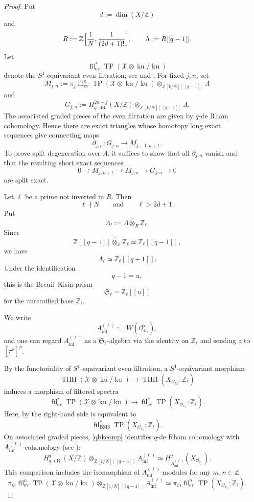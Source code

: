 \documentclass[11pt]{amsart}
\numberwithin{equation}{section}
\newcommand{\Z}{\mathbb{Z}}
\newcommand{\sO}{\mathcal{O}}
\newcommand{\ev}{\operatorname{ev}}
\newcommand{\mf}{\mathfrak}
\newcommand{\qdR}{q\text{-}\operatorname{{dR}}}
\newcommand{\fil}{{\operatorname{fil}}}
\newcommand{\BMS}{\mathrm{BMS}}
\newcommand{\mS}{\mf{S}}
\numberwithin{equation}{section}
\newcommand{\Ainf}{A_{\operatorname{inf}}}
\newcommand{\THH}{\operatorname{THH}}
\newcommand{\TP}{\operatorname{TP}}
\newcommand{\ku}{\operatorname{ku}}
\begin{document}
\begin{proof}
Put
\[
  d:=\dim(X/\Z)
\]
and
\[
  R:=\Z\Bigl[\frac{1}{N},\frac{1}{(2d+1)!}\Bigr],
  \qquad
  \Lambda:=R[[q-1]].
\]
Let
\[
  \fil_{\ev}^{*}
  \TP(\mathcal X\otimes\ku/\ku)
\]
denote the $S^1$-equivariant even filtration; see \cite{HRW22} and \cite{P25}. For fixed $j,n$, set
\[
  M_{j,n}:=
  \pi_j\fil_{\ev}^{n}
  \TP(\mathcal X\otimes\ku/\ku)
  \otimes_{\Z[1/N][[q-1]]}\Lambda
\]
and
\[
  G_{j,n}:=
  H_{\qdR}^{2n-j}(X/\Z)
  \otimes_{\Z[1/N][[q-1]]}\Lambda .
\]
The associated graded pieces of the even filtration are given by
$q$-de Rham cohomology. Hence there are exact triangles whose homotopy
long exact sequences give connecting maps
\[
  \partial_{j,n}:G_{j,n}\longrightarrow M_{j-1,n+1}.
\]
To prove split degeneration over $\Lambda$, it suffices to show that all
$\partial_{j,n}$ vanish and that the resulting short exact sequences
\begin{equation}\label{qshort}
  0
  \to
  M_{j,n+1}
  \to
  M_{j,n}
  \to
  G_{j,n}
  \to
  0
\end{equation}
are split exact.

Let $\ell$ be a prime not inverted in $R$. Then
\[
  \ell\nmid N
  \qquad\text{and}\qquad
  \ell>2d+1.
\]
Put
\[
  \Lambda_\ell
  :=
  \Lambda\widehat\otimes_R\Z_\ell .
\]
Since
\[
  \Z[[q-1]]\widehat\otimes_{\Z}\Z_\ell
  \simeq
  \Z_\ell[[q-1]],
\]
we have
\[
  \Lambda_\ell\simeq \Z_\ell[[q-1]].
\]
Under the identification
\[
  q-1=u,
\]
this is the Breuil--Kisin prism
\[
  \mS_\ell=\Z_\ell[[u]]
\]
for the unramified base $\Z_\ell$.

We write
\[
  \Ainf^{(\ell)}:=W(\sO_{\mathbb{C}_\ell}^{\flat}),
  \]
and one can regard $\Ainf^{(\ell)}$ as a $\mS_\ell$-algebra via the identity on $\Z_\ell$ and sending $z$ to $[\pi^{\flat}]^p$.

By the functoriality of $S^1$-equivariant even filtration, a $S^1$-equivariant morphism 
\[
    \THH(\mathcal X\otimes\ku/\ku) \to \THH(X_{\sO_{\mathbb{C}_\ell}};\Z_\ell)
  \]
  induces a morphism of filtered spectra
\begin{equation}\label{qbkcomp}
  \fil_{\ev}^{*}
  \TP(\mathcal X\otimes\ku/\ku)
  \to
  \fil_{\ev}^{*}
  \TP(X_{\sO_{\mathbb{C}_\ell}};\Z_\ell).
\end{equation}
Here, by \cite[Theorem 5.0.3]{HRW22} the right-hand side is equivalent to 
\[
    \fil_{\BMS}^{*}
  \TP(X_{\sO_{\mathbb{C}_\ell}};\Z_\ell).
  \]
On associated graded pieces, \eqref{qbkcomp} identifies
$q$-de Rham cohomology with $\Ainf^{(\ell)}$-cohomology (see \cite[Theorem 17.2]{BS22}):
\[
  H_{\qdR}^{q}(X/\Z)
  \otimes_{\Z[1/N][[q-1]]}
  \Ainf^{(\ell)}
  \simeq
  H_{\Ainf^{(\ell)}}^{q}(X_{\sO_{\mathbb{C}_\ell}}).
\]
This comparison includes the isomorphism of $\Ainf^{(\ell)}$-modules for any $m,n\in\Z$
\begin{equation}\label{qbkcompisom}
  \pi_m\fil_{\ev}^{n}
  \TP(\mathcal X\otimes\ku/\ku) \otimes_{\Z[1/N][[q-1]]}
  \Ainf^{(\ell)}
  \simeq
  \pi_m\fil_{\ev}^{n}
  \TP(X_{\sO_{\mathbb{C}_\ell}};\Z_\ell).
\end{equation}


\end{proof}
\end{document}
